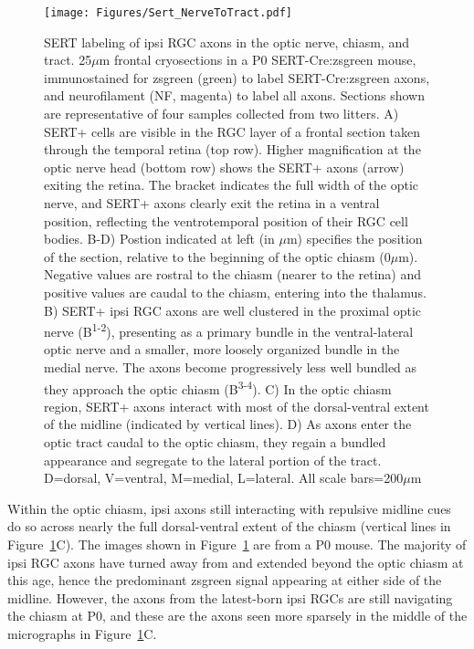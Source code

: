 \begin{figure}[hbtp]
	\begin{center}
		\texttt{[image: Figures/Sert\_NerveToTract.pdf]}
		\caption[SERT labeling of ipsi RGC axons in the optic nerve, chiasm, and tract.]
		{SERT labeling of ipsi RGC axons in the optic nerve, chiasm, and tract. 
		25$\mu$m frontal cryosections in a P0 SERT-Cre:zsgreen mouse, immunostained for zsgreen (green) to label SERT-Cre:zsgreen axons, and neurofilament (NF, magenta) to label all axons.
		Sections shown are representative of four samples collected from two litters. %
		A) SERT+ cells are visible in the RGC layer of a frontal section taken through the temporal retina (top row).
		Higher magnification at the optic nerve head (bottom row) shows the SERT+ axons (arrow) exiting the retina.
		The bracket indicates the full width of the optic nerve, and SERT+ axons clearly exit the retina in a ventral position, reflecting the ventrotemporal position of their RGC cell bodies.
		B-D) Postion indicated at left (in $\mu$m) specifies the position of the section, relative to the beginning of the optic chiasm (0$\mu$m).
		Negative values are rostral to the chiasm (nearer to the retina) and positive values are caudal to the chiasm, entering into the thalamus.
		B) SERT+ ipsi RGC axons are well clustered in the proximal optic nerve (B\textsuperscript{1-2}), presenting as a primary bundle in the ventral-lateral optic nerve and a smaller, more loosely organized bundle in the medial nerve. 
		The axons become progressively less well bundled as they approach the optic chiasm (B\textsuperscript{3-4}). 
		C) In the optic chiasm region, SERT+ axons interact with most of the dorsal-ventral extent of the midline (indicated by vertical lines).
		D) As axons enter the optic tract caudal to the optic chiasm, they regain a bundled appearance and segregate to the lateral portion of the tract.
		D=dorsal, V=ventral, M=medial, L=lateral. 
		All scale bars=200$\mu$m}
		\label{Figures/Sert_NerveToTract}
	\end{center}
\end{figure}

Within the optic chiasm, ipsi axons still interacting with repulsive midline cues do so across nearly the full dorsal-ventral extent of the chiasm (vertical lines in Figure~\ref{Figures/Sert_NerveToTract}C).
The images shown in Figure~\ref{Figures/Sert_NerveToTract} are from a P0 mouse.
The majority of ipsi RGC axons have turned away from and extended beyond the optic chiasm at this age, hence the predominant zsgreen signal appearing at either side of the midline.
However, the axons from the latest-born ipsi RGCs are still navigating the chiasm at P0, and these are the axons seen more sparsely in the middle of the micrographs in Figure~\ref{Figures/Sert_NerveToTract}C.

